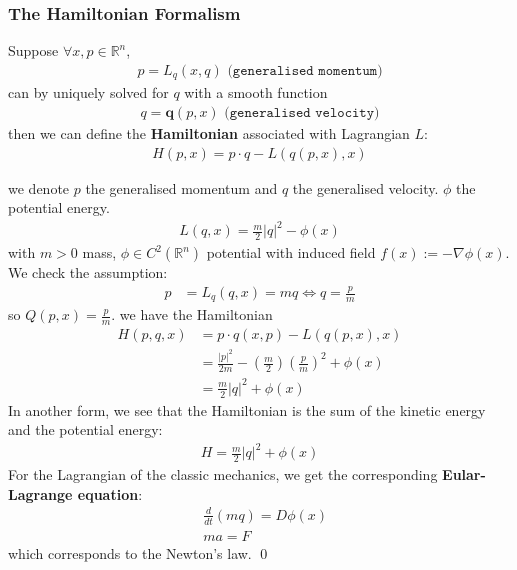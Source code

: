 \subsubsection{The Hamiltonian Formalism}
\begin{definition}[Hamiltonian]
Suppose $\forall x, p \in \mathbb{R}^n$, 
\begin{align*}
	p= L_q(x, q) \texttt{ (generalised momentum)}
\end{align*}
can by uniquely solved for $q$ with a smooth function 
\begin{align*}
	q = \textbf{q}(p, x) \texttt{ (generalised velocity)}
\end{align*}
then we can define the \textbf{Hamiltonian} associated with Lagrangian $L$:
	\begin{align*}
		H(p, x) = p \cdot q - L(q(p, x) , x)
	\end{align*}
\end{definition} 

\begin{example}
we denote $p$ the generalised momentum and $q$ the generalised velocity. $\phi$ the potential energy.
\begin{align*}
	L(q, x) = \frac{m}{2}|q|^2 - \phi(x)
\end{align*}	
with $m > 0$ mass, $\phi \in C^2(\mathbb{R}^n)$ potential with induced field $f(x):= -\nabla \phi(x)$. We check the assumption:
\begin{align*}
	p &= L_q(q, x) = mq \Leftrightarrow q = \frac{p}{m}
\end{align*}
so $Q(p, x) = \frac{p}{m}$. we have the Hamiltonian
\begin{align*}
	H(p, q, x) &= p \cdot q(x, p) - L(q(p, x), x)\\
	&=  \frac{|p|^2}{2 m }  - (\frac{m}{2}) (\frac{p}{m})^2 + \phi(x)\\
	&= \frac{m}{2} |q|^2 + \phi(x)
\end{align*}
In another form, we see that the Hamiltonian is the sum of the kinetic energy and the potential energy:
\begin{align*}
	H = \frac{m}{2} |q|^2 + \phi(x)
\end{align*}
For the Lagrangian of the classic mechanics, we get the corresponding \textbf{Eular-Lagrange equation}:
\begin{align*}
	&\frac{d}{dt}(mq) = D \phi(x)\\
	&ma = F
\end{align*}
which corresponds to the Newton's law.  \qed
\end{example}



